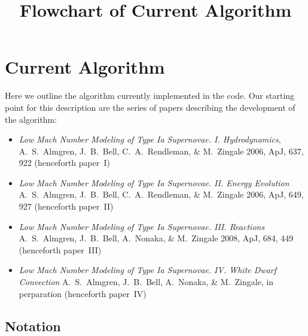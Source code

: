 \documentclass[11pt]{article}
\title{Flowchart of Current Algorithm}
\begin{document}
\maketitle
\tableofcontents
\cleardoublepage


\section{Current Algorithm}

Here we outline the algorithm currently implemented in the code.  Our
starting point for this description are the series of papers describing
the development of the algorithm:
\begin{itemize}
\item {\em Low Mach Number Modeling of Type Ia
  Supernovae. I. Hydrodynamics}, A.~S.~Almgren, J.~B.~Bell, 
  C.~A.~Rendleman, \& M.~Zingale 2006, ApJ, 637, 922 (henceforth
  paper~I)
\item {\em Low Mach Number Modeling of Type Ia Supernovae. II. Energy
  Evolution} A.~S.~Almgren, J.~B.~Bell, C.~A.~Rendleman, \& M.~Zingale
  2006, ApJ, 649, 927 (henceforth paper~II)
\item {\em Low Mach Number Modeling of Type Ia Supernovae. III. Reactions}
A.~S.~Almgren, J.~B.~Bell, A.~Nonaka, \& M.~Zingale
  2008, ApJ, 684, 449 (henceforth paper~III)
\item {\em Low Mach Number Modeling of Type Ia Supernovae. IV. White Dwarf Convection}
A.~S.~Almgren, J.~B.~Bell, A.~Nonaka, \& M.~Zingale,
  in perparation (henceforth paper~IV)
\end{itemize}


\subsection{Notation}
\end{document}
